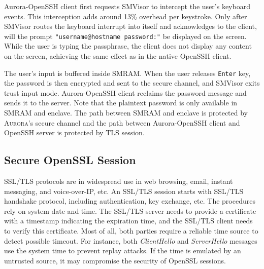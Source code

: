 Aurora-OpenSSH client first requests SMVisor to intercept the user's  keyboard events. This interception adds around 13\% overhead per keystroke. Only after SMVisor routes the keyboard interrupt into itself and acknowledges to the client, will the prompt \texttt{"username@hostname password:"}  be displayed on the screen. While the user is typing the passphrase, the client does not display any content on the screen, achieving the same effect as in the native OpenSSH client.

The user's input is buffered inside SMRAM. When the user releases \texttt{Enter} key, the password is then encrypted and sent to the secure channel, and SMVisor exits trust input mode.  Aurora-OpenSSH client reclaims the password message and sends it to the server. Note that the plaintext password is only available in SMRAM and enclave. The path between SMRAM and enclave is protected by \textsc{Aurora}'s secure channel and the path between Aurora-OpenSSH client and OpenSSH server is protected by TLS session.
%

\subsection{Secure OpenSSL Session}\label{openssl}

SSL/TLS protocols are in widespread use in web browsing, email, instant messaging, and voice-over-IP, etc. 
An SSL/TLS session starts with SSL/TLS handshake protocol, including authentication, key exchange, etc. The procedures rely on system date and time. The SSL/TLS server needs to provide a certificate with a timestamp indicating the expiration time, and the SSL/TLS client needs to verify this certificate. Most of all, both parties require a reliable time source to detect possible timeout. For instance, both \emph{ClientHello} and \emph{ServerHello} messages use the system time to prevent replay attacks. If the time is emulated by an untrusted source, it may %
compromise the security of OpenSSL sessions.

